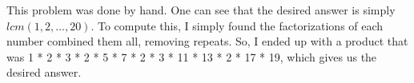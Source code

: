 \documentclass[12pt]{article}
\begin{document}
\noindent
This problem was done by hand. One can see that the desired answer is simply $lcm(1, 2, \dots, 20)$. 
To compute this, I simply found the factorizations of each number combined them all, removing repeats.
So, I ended up with a product that was 1 * 2 * 3 * 2 * 5 * 7 * 2 * 3 * 11 * 13 * 2 * 17 * 19, which 
gives us the desired answer.
\end{document}

